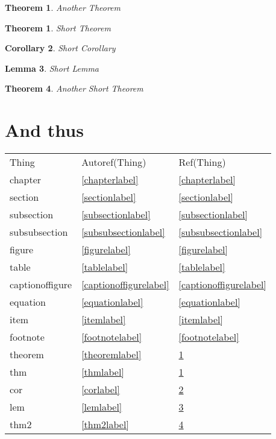 \documentclass{book}
\newtheorem{theorem}{Theorem}
\newtheorem{thm}{Theorem}[section]
\newtheorem{cor}[thm]{Corollary}
\newtheorem{lem}[thm]{Lemma}
\newcommand*{\refs}[1]{#1 & \autoref{#1label} & \ref{#1label}}
\begin{document}
\begin{theorem}\label{theoremlabel} Another Theorem\end{theorem}

\begin{thm}\label{thmlabel} Short Theorem\end{thm}
\begin{cor}\label{corlabel} Short Corollary\end{cor}
\begin{lem}\label{lemlabel} Short Lemma\end{lem}
\begin{thm}\label{thm2label} Another Short Theorem\end{thm}

\section{And thus}
\begin{tabular}{lll}
Thing & Autoref(Thing) & Ref(Thing) \\
\refs{chapter} \\
\refs{section} \\
\refs{subsection} \\
\refs{subsubsection} \\
\refs{figure} \\
\refs{table} \\
\refs{captionoffigure} \\
\refs{equation} \\
\refs{item} \\
\refs{footnote} \\
\refs{theorem}\\
\refs{thm}\\
\refs{cor}\\
\refs{lem}\\
\refs{thm2}\\
\end{tabular}
\end{document}

